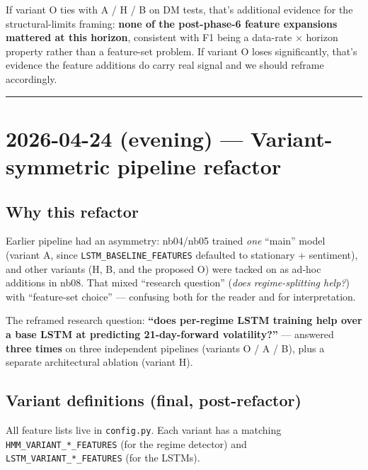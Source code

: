 \documentclass[11pt]{article}
\begin{document}
If variant O ties with A / H / B on DM tests, that's additional evidence for the structural-limits framing: \textbf{none of the post-phase-6 feature expansions mattered at this horizon}, consistent with F1 being a data-rate $\times$ horizon property rather than a feature-set problem. If variant O loses significantly, that's evidence the feature additions do carry real signal and we should reframe accordingly.

\vspace{1em}
\hrule
\vspace{1em}

\section*{2026-04-24 (evening) --- Variant-symmetric pipeline refactor}

\subsection*{Why this refactor}

Earlier pipeline had an asymmetry: nb04/nb05 trained \emph{one} ``main'' model (variant A, since \texttt{LSTM\_BASELINE\_FEATURES} defaulted to stationary + sentiment), and other variants (H, B, and the proposed O) were tacked on as ad-hoc additions in nb08. That mixed ``research question'' (\emph{does regime-splitting help?}) with ``feature-set choice'' --- confusing both for the reader and for interpretation.

The reframed research question: \textbf{``does per-regime LSTM training help over a base LSTM at predicting 21-day-forward volatility?''} --- answered \textbf{three times} on three independent pipelines (variants O / A / B), plus a separate architectural ablation (variant H).

\subsection*{Variant definitions (final, post-refactor)}

All feature lists live in \texttt{config.py}. Each variant has a matching \texttt{HMM\_VARIANT\_*\_FEATURES} (for the regime detector) and \texttt{LSTM\_VARIANT\_*\_FEATURES} (for the LSTMs).
\end{document}
